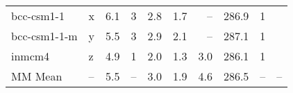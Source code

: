 \begin{table}
\begin{tabular}{llrrrrrrrl}
bcc-csm1-1    &   x &   6.1 &                       3 &  2.8 &  1.7 &    -- &  286.9 &                      1 &  \citet{stocker2013ipcc} \\
bcc-csm1-1-m  &   y &   5.5 &                       3 &  2.9 &  2.1 &    -- &  287.1 &                      1 &  \citet{stocker2013ipcc} \\
inmcm4        &   z &   4.9 &                       1 &  2.0 &  1.3 &   3.0 &  286.1 &                      1 &     \citet{gregory15tcr} \\
MM Mean       &  -- &   5.5 &                    -- &  3.0 &  1.9 &   4.6 &  286.5 &                   -- &                       -- \\
\bottomrule
\end{tabular}
\end{table}

